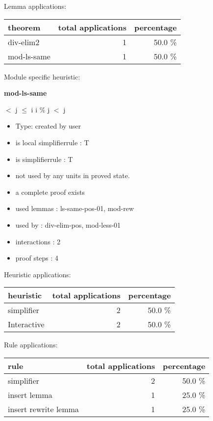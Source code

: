 \documentclass[a4paper]{article}
\begin{document}
Lemma applications:

\begin{supertabular}{l|r|r}
theorem	        & total applications & percentage \\ \hline
div-elim2 & 1 & 50.0 \% \\
mod-ls-same & 1 & 50.0 \% \\

\end{supertabular}

Module specific heuristic:

\pagebreak

{\LARGE\bf mod-ls-same}\label{lemma-mod-ls-same}

\medskip

  $<$ j  $\le$ i \Imp i \% j $<$ j

\begin{itemize}

\item Type: created by user

\item is local simplifierrule : T
\item is simplifierrule : T
\item not used by any units in proved state.
\item       a complete proof exists
\item       used lemmas  : ls-same-pos-01, mod-rew
\item       used by      : div-elim-pos, mod-less-01
\item       interactions : 2
\item       proof steps  : 4
\end{itemize}

\medskip


Heuristic applications:

\begin{supertabular}{l|r|r}
heuristic	& total applications & percentage \\ \hline
simplifier & 2 & 50.0 \% \\
Interactive & 2 & 50.0 \% \\

\end{supertabular}

Rule applications:

\begin{supertabular}{l|r|r}
rule	        & total applications & percentage \\ \hline
simplifier & 2 & 50.0 \% \\
insert lemma & 1 & 25.0 \% \\
insert rewrite lemma & 1 & 25.0 \% \\

\end{supertabular}
\end{document}
